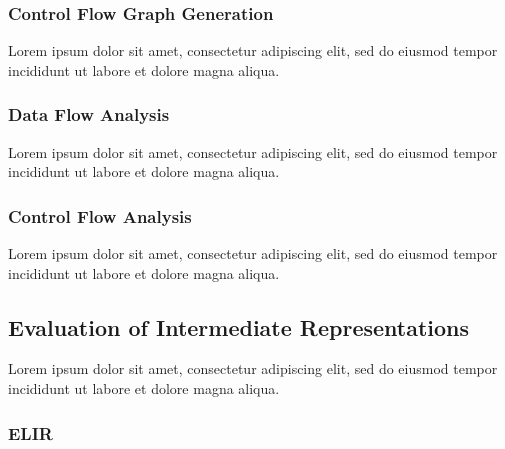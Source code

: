 \documentclass[12pt, a4paper]{article}
\begin{document}
\subsubsection{Control Flow Graph Generation}

Lorem ipsum dolor sit amet, consectetur adipiscing elit, sed do eiusmod tempor incididunt ut labore et dolore magna aliqua.


\subsubsection{Data Flow Analysis}

Lorem ipsum dolor sit amet, consectetur adipiscing elit, sed do eiusmod tempor incididunt ut labore et dolore magna aliqua.

\cite{type_decomp}


\subsubsection{Control Flow Analysis}

Lorem ipsum dolor sit amet, consectetur adipiscing elit, sed do eiusmod tempor incididunt ut labore et dolore magna aliqua.


\subsection{Evaluation of Intermediate Representations}



Lorem ipsum dolor sit amet, consectetur adipiscing elit, sed do eiusmod tempor incididunt ut labore et dolore magna aliqua.


\subsubsection{ELIR}
\end{document}

